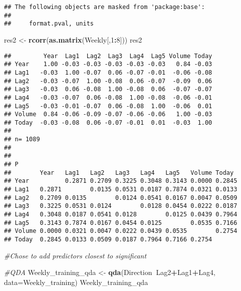 \documentclass[]{article}
\newenvironment{Shaded}{\begin{snugshade}}{\end{snugshade}}
\newcommand{\KeywordTok}[1]{\textcolor[rgb]{0.13,0.29,0.53}{\textbf{#1}}}
\newcommand{\DataTypeTok}[1]{\textcolor[rgb]{0.13,0.29,0.53}{#1}}
\newcommand{\DecValTok}[1]{\textcolor[rgb]{0.00,0.00,0.81}{#1}}
\newcommand{\StringTok}[1]{\textcolor[rgb]{0.31,0.60,0.02}{#1}}
\newcommand{\CommentTok}[1]{\textcolor[rgb]{0.56,0.35,0.01}{\textit{#1}}}
\newcommand{\OperatorTok}[1]{\textcolor[rgb]{0.81,0.36,0.00}{\textbf{#1}}}
\newcommand{\NormalTok}[1]{#1}
\begin{document}
\begin{verbatim}
## The following objects are masked from 'package:base':
## 
##     format.pval, units
\end{verbatim}

\begin{Shaded}
\begin{Highlighting}[]
\NormalTok{res2 <-}\StringTok{ }\KeywordTok{rcorr}\NormalTok{(}\KeywordTok{as.matrix}\NormalTok{(Weekly[,}\DecValTok{1}\OperatorTok{:}\DecValTok{8}\NormalTok{]))}
\NormalTok{res2}
\end{Highlighting}
\end{Shaded}

\begin{verbatim}
##         Year  Lag1  Lag2  Lag3  Lag4  Lag5 Volume Today
## Year    1.00 -0.03 -0.03 -0.03 -0.03 -0.03   0.84 -0.03
## Lag1   -0.03  1.00 -0.07  0.06 -0.07 -0.01  -0.06 -0.08
## Lag2   -0.03 -0.07  1.00 -0.08  0.06 -0.07  -0.09  0.06
## Lag3   -0.03  0.06 -0.08  1.00 -0.08  0.06  -0.07 -0.07
## Lag4   -0.03 -0.07  0.06 -0.08  1.00 -0.08  -0.06 -0.01
## Lag5   -0.03 -0.01 -0.07  0.06 -0.08  1.00  -0.06  0.01
## Volume  0.84 -0.06 -0.09 -0.07 -0.06 -0.06   1.00 -0.03
## Today  -0.03 -0.08  0.06 -0.07 -0.01  0.01  -0.03  1.00
## 
## n= 1089 
## 
## 
## P
##        Year   Lag1   Lag2   Lag3   Lag4   Lag5   Volume Today 
## Year          0.2871 0.2709 0.3225 0.3048 0.3143 0.0000 0.2845
## Lag1   0.2871        0.0135 0.0531 0.0187 0.7874 0.0321 0.0133
## Lag2   0.2709 0.0135        0.0124 0.0541 0.0167 0.0047 0.0509
## Lag3   0.3225 0.0531 0.0124        0.0128 0.0454 0.0222 0.0187
## Lag4   0.3048 0.0187 0.0541 0.0128        0.0125 0.0439 0.7964
## Lag5   0.3143 0.7874 0.0167 0.0454 0.0125        0.0535 0.7166
## Volume 0.0000 0.0321 0.0047 0.0222 0.0439 0.0535        0.2754
## Today  0.2845 0.0133 0.0509 0.0187 0.7964 0.7166 0.2754
\end{verbatim}

\begin{Shaded}
\begin{Highlighting}[]
\CommentTok{#Chose to add predictors closest to significant }

\CommentTok{#QDA}
\NormalTok{Weekly_training_qda <-}\StringTok{ }\KeywordTok{qda}\NormalTok{(Direction}\OperatorTok{~}\NormalTok{Lag2}\OperatorTok{+}\NormalTok{Lag1}\OperatorTok{+}\NormalTok{Lag4, }\DataTypeTok{data=}\NormalTok{Weekly_training)}
\NormalTok{Weekly_training_qda}
\end{Highlighting}
\end{Shaded}
\end{document}
